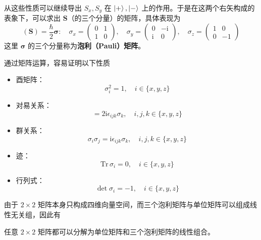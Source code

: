 \documentclass[cn,10pt,math=newtx,citestyle=gb7714-2015,bibstyle=gb7714-2015]{elegantbook}
\def\bm{\boldsymbol}
\def\i{\mathrm i}
\begin{document}
从这些性质可以继续导出 $S_x,S_y$ 在 $\ket{+},\ket{-}$ 上的作用。于是在这两个右矢构成的表象下，可以求出 $\bm S$（的三个分量）的矩阵，具体表现为
\begin{equation}
    (\bm S) = \frac{\hbar} 2\bm\sigma:\quad \sigma_x=\begin{pmatrix}
    0 & 1 \\ 1 & 0
    \end{pmatrix},\quad \sigma_y=\begin{pmatrix}
    0 & -\i \\ \i & 0
    \end{pmatrix},\quad \sigma_z=\begin{pmatrix}
    1 & 0 \\ 0 & -1
    \end{pmatrix}
\end{equation}
这里 $\bm \sigma$ 的三个分量称为\textbf{泡利（Pauli）矩阵}。

\begin{theorem}[泡利矩阵的性质]
   通过矩阵运算，容易证明以下性质
   \begin{itemize}
       \item 酉矩阵：
       \begin{equation}
           \sigma_i^2 = 1,\quad i\in\{x,y,z\}
       \end{equation}
       \item 对易关系：
       \begin{equation}
           [\sigma_i,\sigma_j] = 2\i\epsilon_{ijk}\sigma_k,\quad i,j,k\in\{x,y,z\}
       \end{equation}
       \item 群关系：
       \begin{equation}
           \sigma_i\sigma_j = \i\epsilon_{ijk}\sigma_k,\quad i,j,k\in\{x,y,z\}
       \end{equation}
       \item 迹：
       \begin{equation}
           \text{Tr}\,\sigma_i = 0,\quad i\in\{x,y,z\}
       \end{equation}
       \item 行列式：
       \begin{equation}
           \det \sigma_i = -1,\quad i\in\{x,y,z\}
       \end{equation}
   \end{itemize}
\end{theorem}

由于 $2\times 2$ 矩阵本身只构成四维向量空间，而三个泡利矩阵与单位矩阵可以组成线性无关组，因此有
\begin{corollary}
    任意 $2\times 2$ 矩阵都可以分解为单位矩阵和三个泡利矩阵的线性组合。
\end{corollary}
\end{document}
